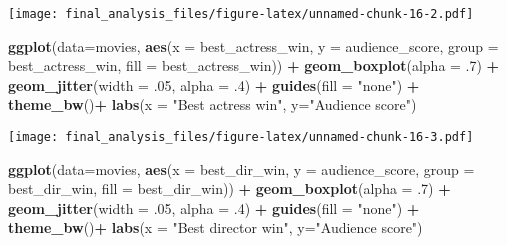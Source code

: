 \documentclass[]{article}
\newenvironment{Shaded}{\begin{snugshade}}{\end{snugshade}}
\newcommand{\KeywordTok}[1]{\textcolor[rgb]{0.13,0.29,0.53}{\textbf{#1}}}
\newcommand{\DataTypeTok}[1]{\textcolor[rgb]{0.13,0.29,0.53}{#1}}
\newcommand{\DecValTok}[1]{\textcolor[rgb]{0.00,0.00,0.81}{#1}}
\newcommand{\StringTok}[1]{\textcolor[rgb]{0.31,0.60,0.02}{#1}}
\newcommand{\OperatorTok}[1]{\textcolor[rgb]{0.81,0.36,0.00}{\textbf{#1}}}
\newcommand{\NormalTok}[1]{#1}
\begin{document}
\texttt{[image: final\_analysis\_files/figure-latex/unnamed-chunk-16-2.pdf]}

\begin{Shaded}
\begin{Highlighting}[]
\KeywordTok{ggplot}\NormalTok{(}\DataTypeTok{data=}\NormalTok{movies, }\KeywordTok{aes}\NormalTok{(}\DataTypeTok{x =}\NormalTok{ best_actress_win, }\DataTypeTok{y =}\NormalTok{ audience_score, }\DataTypeTok{group =}\NormalTok{ best_actress_win, }\DataTypeTok{fill =}\NormalTok{ best_actress_win)) }\OperatorTok{+}\StringTok{ }\KeywordTok{geom_boxplot}\NormalTok{(}\DataTypeTok{alpha =}\NormalTok{ .}\DecValTok{7}\NormalTok{) }\OperatorTok{+}\StringTok{ }\KeywordTok{geom_jitter}\NormalTok{(}\DataTypeTok{width =}\NormalTok{ .}\DecValTok{05}\NormalTok{, }\DataTypeTok{alpha =}\NormalTok{ .}\DecValTok{4}\NormalTok{) }\OperatorTok{+}\StringTok{ }\KeywordTok{guides}\NormalTok{(}\DataTypeTok{fill =} \StringTok{"none"}\NormalTok{) }\OperatorTok{+}\StringTok{ }\KeywordTok{theme_bw}\NormalTok{()}\OperatorTok{+}
\StringTok{  }\KeywordTok{labs}\NormalTok{(}\DataTypeTok{x =} \StringTok{"Best actress win"}\NormalTok{, }\DataTypeTok{y=}\StringTok{"Audience score"}\NormalTok{)}
\end{Highlighting}
\end{Shaded}

\texttt{[image: final\_analysis\_files/figure-latex/unnamed-chunk-16-3.pdf]}

\begin{Shaded}
\begin{Highlighting}[]
\KeywordTok{ggplot}\NormalTok{(}\DataTypeTok{data=}\NormalTok{movies, }\KeywordTok{aes}\NormalTok{(}\DataTypeTok{x =}\NormalTok{ best_dir_win, }\DataTypeTok{y =}\NormalTok{ audience_score, }\DataTypeTok{group =}\NormalTok{ best_dir_win, }\DataTypeTok{fill =}\NormalTok{ best_dir_win)) }\OperatorTok{+}\StringTok{ }\KeywordTok{geom_boxplot}\NormalTok{(}\DataTypeTok{alpha =}\NormalTok{ .}\DecValTok{7}\NormalTok{) }\OperatorTok{+}\StringTok{ }\KeywordTok{geom_jitter}\NormalTok{(}\DataTypeTok{width =}\NormalTok{ .}\DecValTok{05}\NormalTok{, }\DataTypeTok{alpha =}\NormalTok{ .}\DecValTok{4}\NormalTok{) }\OperatorTok{+}\StringTok{ }\KeywordTok{guides}\NormalTok{(}\DataTypeTok{fill =} \StringTok{"none"}\NormalTok{) }\OperatorTok{+}\StringTok{ }\KeywordTok{theme_bw}\NormalTok{()}\OperatorTok{+}
\KeywordTok{labs}\NormalTok{(}\DataTypeTok{x =} \StringTok{"Best director win"}\NormalTok{, }\DataTypeTok{y=}\StringTok{"Audience score"}\NormalTok{)}
\end{Highlighting}
\end{Shaded}
\end{document}
